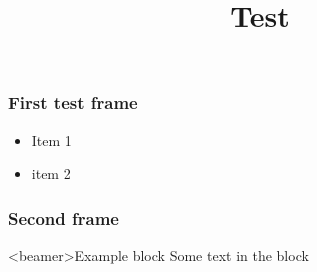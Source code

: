 \documentclass {beamer}
\title[Test Title]{Test}
\begin{document}
{
\begin{frame}[noframenumbering]
\titlepage
\end{frame}
}

\begin{frame}
\frametitle{First test frame}

\begin{itemize}
\item Item 1
\item item 2
\end{itemize}
\end{frame}

\begin{frame}
\frametitle<beamer>{Second frame}
\begin{block}<beamer>{Example block}
Some text in the block
\end{block}
\end{frame}
\end{document}
